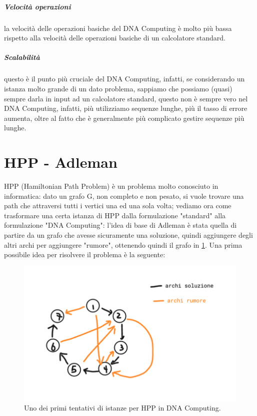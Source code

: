\documentclass[12pt,a4paper]{report}
\begin{document}
\subparagraph{Velocità operazioni}
la velocità delle operazioni basiche del DNA Computing è molto più bassa rispetto alla velocità delle operazioni basiche di un calcolatore standard.

\subparagraph{Scalabilità}
questo è il punto più cruciale del DNA Computing, infatti, se considerando un istanza molto grande di un dato problema, sappiamo che possiamo (quasi) sempre darla in input ad un calcolatore standard, questo non è sempre vero nel DNA Computing, infatti, più utilizziamo sequenze lunghe, più il tasso di errore aumenta, oltre al fatto che è generalmente più complicato gestire sequenze più lunghe.

\section{HPP - Adleman}
HPP (Hamiltonian Path Problem) è un problema molto conosciuto in informatica: dato un grafo G, non completo e non pesato, si vuole trovare una path che attraversi tutti i vertici una ed una sola volta; vediamo ora come trasformare una certa istanza di HPP dalla formulazione "standard" alla formulazione "DNA Computing": l'idea di base di Adleman è stata quella di partire da un grafo che avesse sicuramente una soluzione, quindi aggiungere degli altri archi per aggiungere "rumore", ottenendo quindi il grafo in \ref{fig:1}. Una prima possibile idea per risolvere il problema è la seguente:
\begin{figure}[h]
	\centering
	\includegraphics[width=0.7\linewidth]{img/hpp dna graph 1}
	\caption{Uno dei primi tentativi di istanze per HPP in DNA Computing.}
	\label{fig:1}
\end{figure}
\end{document}
